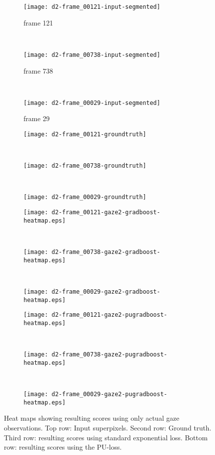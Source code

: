 \begin{figure}[ht]
	\centering
	\begin{subfigure}[h]{0.32\textwidth}
	\texttt{[image: d2-frame\_00121-input-segmented]}	
		\caption*{frame 121}
	\end{subfigure}
	~
	\begin{subfigure}[h]{0.32\textwidth}
	\texttt{[image: d2-frame\_00738-input-segmented]}	
		\caption*{frame 738}
	\end{subfigure}
	~
	\begin{subfigure}[h]{0.32\textwidth}
	\texttt{[image: d2-frame\_00029-input-segmented]}	
		\caption*{frame 29}
	\end{subfigure}
	
	\vspace{3mm}
	\begin{subfigure}[h]{0.32\textwidth}
	\texttt{[image: d2-frame\_00121-groundtruth]}	
	\end{subfigure}
	~
	\begin{subfigure}[h]{0.32\textwidth}
	\texttt{[image: d2-frame\_00738-groundtruth]}	
	\end{subfigure}
	~
	\begin{subfigure}[h]{0.32\textwidth}
	\texttt{[image: d2-frame\_00029-groundtruth]}	
	\end{subfigure}
	
	\vspace{3mm}
	\begin{subfigure}[h]{0.32\textwidth}
	\texttt{[image: d2-frame\_00121-gaze2-gradboost-heatmap.eps]}	
	\end{subfigure}
	~
	\begin{subfigure}[h]{0.32\textwidth}
	\texttt{[image: d2-frame\_00738-gaze2-gradboost-heatmap.eps]}
	\end{subfigure}
	~	
	\begin{subfigure}[h]{0.32\textwidth}
	\texttt{[image: d2-frame\_00029-gaze2-gradboost-heatmap.eps]}	
	\end{subfigure}
	
	\vspace{3mm}
	\begin{subfigure}[h]{0.32\textwidth}
	\texttt{[image: d2-frame\_00121-gaze2-pugradboost-heatmap.eps]}	
	\end{subfigure}
	~
	\begin{subfigure}[h]{0.32\textwidth}
	\texttt{[image: d2-frame\_00738-gaze2-pugradboost-heatmap.eps]}	
	\end{subfigure}
	~	
	\begin{subfigure}[h]{0.32\textwidth}
	\texttt{[image: d2-frame\_00029-gaze2-pugradboost-heatmap.eps]}	
	\end{subfigure}	
	
	\caption{Heat maps showing resulting scores using only actual gaze observations. Top row: Input superpixels. Second row: Ground truth. Third row: resulting scores using standard exponential loss. Bottom row: resulting scores using the PU-loss.}
	\label{fig:results-d2-gaze2}
\end{figure}

